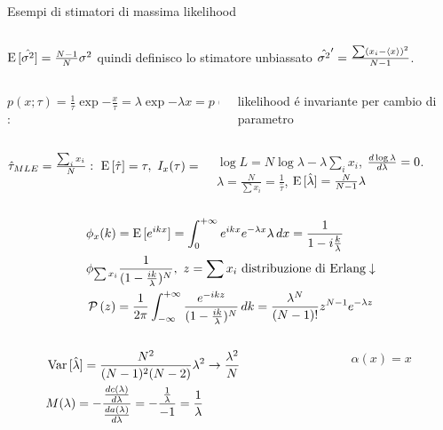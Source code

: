 \documentclass[asd-beamer.tex]{subfiles}
\begin{document}
\begin{frame}{Esempi di stimatori di massima likelihood}
\begin{columns}[T]
\end{columns}
$\operatorname{E}{[\hat{\sigma^2}]}=\frac{N-1}{N}\sigma^2$ quindi definisco lo stimatore unbiassato $\hat{\sigma^2}'=\frac{\sum(x_i-\langle x \rangle)^2}{N-1}$.
\begin{columns}[T]
\begin{column}{0.6\textwidth}
 $p(x;\tau)=\frac{1}{\tau}\exp{-\frac{x}{\tau}}=\lambda\exp{-\lambda x}=p(x;\lambda)$:
\end{column}
\begin{column}{0.4\textwidth}
likelihood \'e invariante per cambio di parametro
\end{column}
\end{columns}
\begin{columns}[b]
\begin{column}{0.4\textwidth}
$\hat{\tau}_{MLE}=\frac{\sum_ix_i}{N}:\ \E{[\hat{\tau}]}=\tau,\ I_x(\tau)=\frac{1}{\var{\hat{\tau}}},\ \var{\hat{\tau}}=\frac{\tau^2}{N}$
\end{column}
\begin{column}{0.6\textwidth}
$\log{L}=N\log{\lambda}-\lambda\sum_ix_i$, $\frac{d \log{\lambda}}{d \lambda}=0$. $\hat{\lambda}=\frac{N}{\sum x_i}=\frac{1}{\hat{\tau}}$, $\operatorname{E}{[\hat{\lambda}]}=\frac{N}{N-1}\lambda$
\end{column}
\end{columns}
\begin{align*}
&\phi_x(k)=\E{[\exp{ikx}]}=\intzi\exp{ikx}\exp{-\lambda x}\lambda\,dx=\frac{1}{1-i\frac{k}{\lambda}}\\
&\phi_{\sum x_i}\frac{1}{(1-\frac{ik}{\lambda})^N},\ z=\sum x_i\ \text{distribuzione di Erlang}\downarrow\\
&\prob{(z)}=\frac{1}{2\pi}\intsinf{}\frac{\exp{-ikz}}{(1-\frac{ik}{\lambda})^N}\,dk=\frac{\lambda^N}{(N-1)!}z^{N-1}\exp{-\lambda z}
\end{align*}
\begin{columns}[T]
\begin{column}{0.65\textwidth}
\begin{align*}
&\operatorname{Var}{[\hat{\lambda}]}=\frac{N^2}{(N-1)^2(N-2)}\lambda^2\to\frac{\lambda^2}{N}\\
&M(\lambda)=-\frac{\frac{d c(\lambda)}{d \lambda}}{\frac{d a(\lambda)}{d \lambda}}=-\frac{\frac{1}{\lambda}}{-1}=\frac{1}{\lambda}
\end{align*}
\end{column}
\begin{column}{0.35\textwidth}
\begin{align*}
&\alpha(x)=x\\

\end{align*}
\end{column}
\end{columns}
\end{frame}
\end{document}
